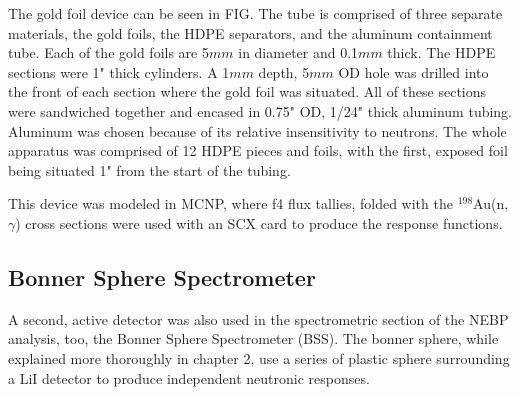 The gold foil device can be seen in FIG.
The tube is comprised of three separate materials, the gold foils, the HDPE separators, and the aluminum containment tube.
Each of the gold foils are 5$mm$ in diameter and 0.1$mm$ thick.
The HDPE sections were 1" thick cylinders.
A 1$mm$ depth, 5$mm$ OD hole was drilled into the front of each section where the gold foil was situated.
All of these sections were sandwiched together and encased in 0.75" OD, 1/24" thick aluminum tubing.
Aluminum was chosen because of its relative insensitivity to neutrons.
The whole apparatus was comprised of 12 HDPE pieces and foils, with the first, exposed foil being situated 1" from the start of the tubing.

This device was modeled in MCNP, where f4 flux tallies, folded with the $^{198}$Au(n,$\gamma$) cross sections were used with an SCX card to produce the response functions.

\subsection{Bonner Sphere Spectrometer}

A second, active detector was also used in the spectrometric section of the NEBP analysis, too, the Bonner Sphere Spectrometer (BSS).
The bonner sphere, while explained more thoroughly in chapter 2, use a series of plastic sphere surrounding a LiI detector to produce independent neutronic responses.

%




